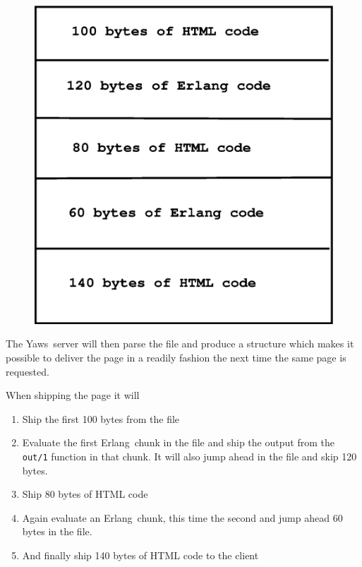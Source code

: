 \documentclass[11pt,oneside,english]{book}
\newcommand{\Erlang}            %
        {{\sc Erlang}}
\newcommand{\Yaws}            %
        {{\sc Yaws}}
\begin{document}
\begin{figure}[h]
\begin{center}

 \includegraphics[scale=0.4] {layout}

\end{center}
\end{figure}

The \Yaws\  server will then parse the file and produce a structure
which makes it possible to deliver the page in a readily fashion the
next time the same page is requested.

When shipping the page it will
\begin{enumerate}
\item Ship the first 100 bytes from the file
\item Evaluate the first \Erlang\  chunk in the file and ship the output
from the \verb+out/1+ function in that chunk. It will also jump ahead
in the file and skip 120 bytes.
\item Ship 80 bytes of HTML code
\item Again evaluate an \Erlang\  chunk, this time the second and jump
ahead 60 bytes in the file.
\item And finally ship 140 bytes of HTML code to the client
\end{enumerate}
\end{document}
